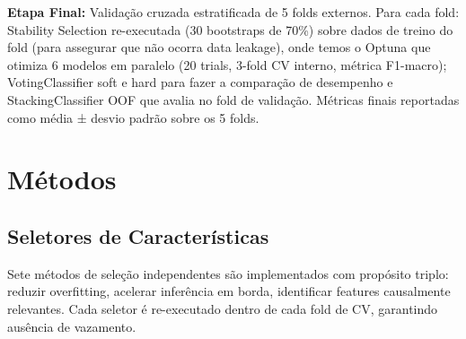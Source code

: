 \documentclass[12pt]{article}
\begin{document}
\textbf{Etapa Final:} Validação cruzada estratificada de 5 folds externos. Para cada fold: Stability Selection re-executada (30 bootstraps de 70\%) sobre dados de treino do fold (para assegurar que não ocorra 
data leakage), onde temos o  Optuna que otimiza 6 modelos em paralelo (20 trials, 3-fold CV interno, métrica F1-macro); VotingClassifier soft e hard para fazer a comparação de 
desempenho e StackingClassifier OOF que avalia no fold de validação. 
Métricas finais reportadas como média ± desvio padrão sobre os 5 folds.


\section{Métodos}

\subsection{Seletores de Características}

Sete métodos de seleção independentes são implementados com propósito triplo: reduzir overfitting, acelerar inferência em borda, identificar features causalmente relevantes. Cada seletor é re-executado dentro de cada fold de CV, garantindo ausência de vazamento.
\end{document}
